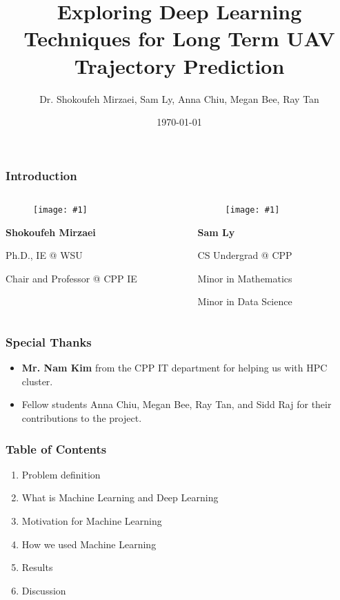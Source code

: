 \documentclass{beamer}
\title{
    Exploring Deep Learning Techniques for Long Term UAV Trajectory Prediction
}
\author{
    Dr. Shokoufeh Mirzaei, Sam Ly, Anna Chiu, Megan Bee, Ray Tan
}
\institute{Cal Poly Pomona}
\date{\today}
\newcommand{\personcard}[3]{
    \begin{minipage}{10em}
        \centering
        \begin{figure}
            \texttt{[image: \#1]}
        \end{figure}
        \textbf{#2}

        \small
        #3
    \end{minipage}%
}
\begin{document}
\begin{frame}
    \titlepage
\end{frame}

\begin{frame}
    \frametitle{Introduction}
    \centering

    \begin{columns}
        \begin{column}{10em}
            \personcard{resources/mirzaei.png}{Shokoufeh Mirzaei}{
                Ph.D., IE @ WSU

                Chair and Professor @ CPP IE
            }
        \end{column}
        
        \begin{column}{10em}
            \personcard{resources/sam.png}{Sam Ly}{
                CS Undergrad @ CPP

                Minor in Mathematics

                Minor in Data Science
            }
        \end{column}
    \end{columns}

\end{frame}

\begin{frame}
    \frametitle{Special Thanks}

    \begin{itemize}
        \item \textbf{Mr. Nam Kim} from the CPP IT department for helping us with HPC cluster.
        \item Fellow students Anna Chiu, Megan Bee, Ray Tan, and Sidd Raj for their contributions to the project.
    \end{itemize}
\end{frame}

\begin{frame}
    \frametitle{Table of Contents}

    \begin{enumerate}
        \item Problem definition
        \item What is Machine Learning and Deep Learning
        \item Motivation for Machine Learning
        \item How we used Machine Learning
        \item Results
        \item Discussion
    \end{enumerate}
\end{frame}
\end{document}
